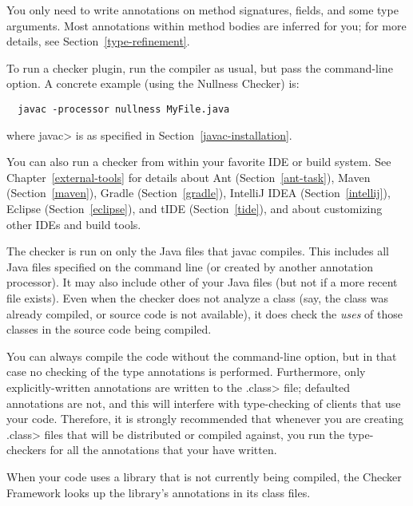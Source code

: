 You only need to write annotations on method signatures, fields, and some type arguments.
Most annotations within method bodies are inferred for you; for more details,
see  Section~\ref{type-refinement}.


To run a checker plugin, run the compiler  as usual,
but pass the  command-line
option.
A concrete example (using the Nullness Checker) is:

\begin{Verbatim}
  javac -processor nullness MyFile.java
\end{Verbatim}

\noindent
where \<javac> is as specified in Section~\ref{javac-installation}.

You can also run a checker from within your favorite IDE or build system.  See
Chapter~\ref{external-tools} for details about
Ant (Section~\ref{ant-task}),
Maven (Section~\ref{maven}),
Gradle (Section~\ref{gradle}),
IntelliJ IDEA (Section~\ref{intellij}),
Eclipse (Section~\ref{eclipse}),
and
tIDE (Section~\ref{tide}),
and about customizing other IDEs and build tools.

The checker is run on only the Java files that javac compiles.
This includes all Java files specified on the command line (or
created by another annotation processor).  It may also include other of
your Java files (but not if a more recent  file exists).
Even when the checker does not analyze a class (say, the class was
already compiled, or source code is not available), it does check
the \emph{uses} of those classes in the source code being compiled.

You can always compile the code without the 
command-line option, but in that case no checking of the type
annotations is performed.  Furthermore, only explicitly-written annotations
are written to the \<.class> file; defaulted annotations are not, and this
will interfere with type-checking of clients that use your code.
Therefore, it is strongly recommended that whenever you are creating
\<.class> files that will be distributed or compiled against, you run the
type-checkers for all the annotations that your have written.



When your code uses a library that is not currently being compiled, the
Checker Framework looks up the library's annotations in its class files.

